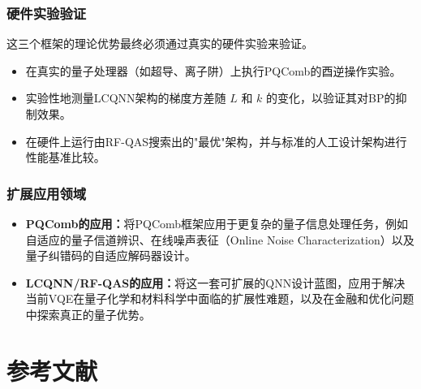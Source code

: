\documentclass[12pt,a4paper]{article}
\begin{document}
\subsubsection{硬件实验验证}

这三个框架的理论优势最终必须通过真实的硬件实验来验证。

\begin{itemize}
\item 在真实的量子处理器（如超导、离子阱）上执行PQComb的酉逆操作实验。
\item 实验性地测量LCQNN架构的梯度方差随 $L$ 和 $k$ 的变化，以验证其对BP的抑制效果。
\item 在硬件上运行由RF-QAS搜索出的"最优"架构，并与标准的人工设计架构进行性能基准比较。
\end{itemize}

\subsubsection{扩展应用领域}

\begin{itemize}
\item \textbf{PQComb的应用：}将PQComb框架应用于更复杂的量子信息处理任务，例如自适应的量子信道辨识、在线噪声表征（Online Noise Characterization）以及量子纠错码的自适应解码器设计。

\item \textbf{LCQNN/RF-QAS的应用：}将这一套可扩展的QNN设计蓝图，应用于解决当前VQE在量子化学和材料科学中面临的扩展性难题，以及在金融和优化问题中探索真正的量子优势。
\end{itemize}

\section*{参考文献}
\end{document}
